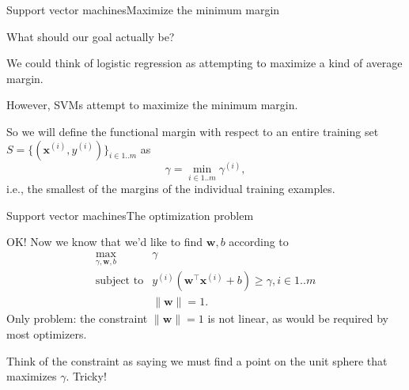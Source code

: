 \documentclass{beamer}
\renewcommand{\vec}[1]{\boldsymbol{#1}}
\begin{document}
\begin{frame}{Support vector machines}{Maximize the minimum margin}

  What should our goal actually be?

  \medskip

  We could think of logistic regression as attempting to maximize a kind
  of average margin.

  \medskip

  However, SVMs attempt to maximize the \alert{minimum} margin.

  \medskip
  
  So we will define the functional margin with respect to an entire training set $S = \{ (\vec{x}^{(i)},y^{(i)}) \}_{i \in 1..m}$ as
  \[ \gamma = \min_{i\in 1..m} \gamma^{(i)}, \]
  i.e., the smallest of the margins of the individual
  training examples.

\end{frame}


\begin{frame}{Support vector machines}{The optimization problem}

  OK! Now we know that we'd like to find $\vec{w},b$ according to
  \[
  \begin{array}{rl}
    \max_{\gamma,\vec{w},b} & \gamma \\ \text{subject to} & y^{(i)}(\vec{w}^\top\vec{x}^{(i)} + b) \ge \gamma, i \in 1..m \\ & \| \vec{w} \| = 1.
  \end{array}
  \]
  Only problem: the constraint $\| \vec{w} \| = 1$ is not linear,
  as would be required by most optimizers.

  \medskip

  Think of the constraint as saying we must find a point on the unit
  sphere that maximizes $\gamma$. Tricky!
  
\end{frame}
\end{document}
